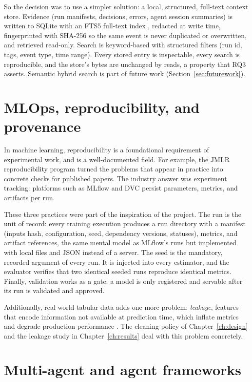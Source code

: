 So the decision was to use a simpler solution: a local, structured, full-text context store. Evidence (run manifests, decisions, errors, agent session summaries) is written to SQLite with an FTS5 full-text index \cite{sqlite2024fts5}, redacted at write time, fingerprinted with SHA-256 so the same event is never duplicated or overwritten, and retrieved read-only. Search is keyword-based with structured filters (run id, tags, event type, time range). Every stored entry is inspectable, every search is reproducible, and the store's bytes are unchanged by reads, a property that RQ3 asserts. Semantic hybrid search is part of future work (Section~\ref{sec:futurework}).

\section{MLOps, reproducibility, and provenance}
\label{sec:bg-mlops}

In machine learning, reproducibility is a foundational requirement of experimental work, and is a well-documented field. For example, the JMLR reproducibility program \cite{pineau2021jmlr} turned the problems that appear in practice into concrete checks for published papers. The industry answer was experiment tracking: platforms such as MLflow \cite{zaharia2018mlflow} and DVC \cite{dvc2024} persist parameters, metrics, and artifacts per run.

These three practices were part of the inspiration of the project. The run is the unit of record: every training execution produces a run directory with a manifest (inputs hash, configuration, seed, dependency versions, statuses), metrics, and artifact references, the same mental model as MLflow's runs but implemented with local files and JSON instead of a server. The seed is the mandatory, recorded argument of every run. It is injected into every estimator, and the evaluator verifies that two identical seeded runs reproduce identical metrics. Finally, validation works as a gate: a model is only registered and servable after its run is validated and approved.

Additionally, real-world tabular data adds one more problem: \emph{leakage}, features that encode information not available at prediction time, which inflate metrics and degrade production performance \cite{kaufman2012leakage}. The cleaning policy of Chapter~\ref{ch:design} and the leakage study in Chapter~\ref{ch:results} deal with this problem concretely.

\section{Multi-agent and agent frameworks}
\label{sec:bg-frameworks}

